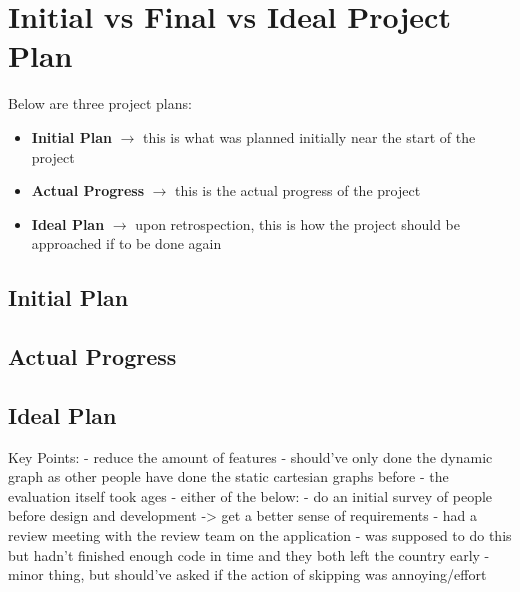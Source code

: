 \section{Initial vs Final vs Ideal Project Plan}%
Below are three project plans:\begin{itemize}
    \item \textbf{Initial Plan} \(\to\) this is what was planned initially near the start of the project
    \item \textbf{Actual Progress} \(\to\) this is the actual progress of the project
    \item \textbf{Ideal Plan} \(\to\) upon retrospection, this is how the project should be approached if to be done again
\end{itemize}

\subsection{Initial Plan}

\subsection{Actual Progress}

\subsection{Ideal Plan}

Key Points:
- reduce the amount of features
    - should've only done the dynamic graph as other people have done the static cartesian graphs before
    - the evaluation itself took ages 
- either of the below:
    - do an initial survey of people before design and development -> get a better sense of requirements
    - had a review meeting with the review team on the application - was supposed to do this but hadn't finished enough code in time and they both left the country early
    - minor thing, but should've asked if the action of skipping was annoying/effort